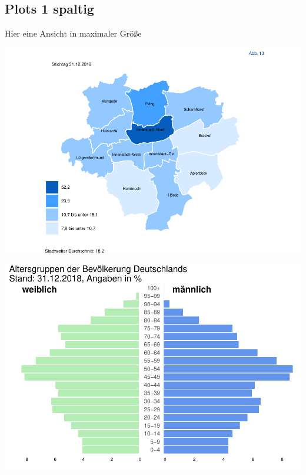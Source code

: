 \documentclass[
  a4paper,
  twoside]{article}
\begin{document}
\newpage

\hypertarget{plots-1-spaltig}{%
\subsection{Plots 1 spaltig}\label{plots-1-spaltig}}

Hier eine Ansicht in maximaler Größe

\includegraphics[width=1\linewidth]{2021-03-02_Beispiel_files/figure-latex/unnamed-chunk-5-1}

\includegraphics[width=1\linewidth]{2021-03-02_Beispiel_files/figure-latex/plot Pyramide 1 spaltig-1}

\newpage
\end{document}
